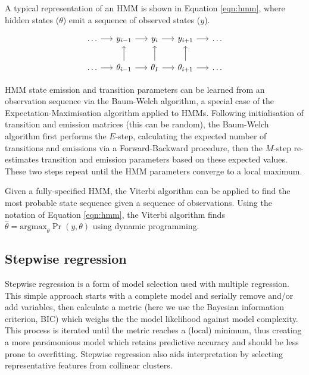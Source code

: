 \documentclass[a4paper,11pt,oneside]{book}
\begin{document}
A typical representation of an HMM is shown in Equation \ref{eqn:hmm}, where hidden states ($\theta$) emit a sequence of observed states ($y$).\cite{Volg2005}

\begin{equation}\label{eqn:hmm}
\begin{tikzcd}[column sep=1.2pc]
\ldots \arrow{r} & y_{i-1} \arrow{r} & y_i \arrow{r} & y_{i+1} \arrow{r} & \ldots\\
\ldots \arrow{r} & \theta_{i-1} \arrow{r} \arrow{u} &
\theta_I \arrow{u} \arrow{r} & \theta_{i+1} \arrow{u} \arrow{r} & \ldots
\end{tikzcd}
\end{equation}

HMM state emission and transition parameters can be learned from an observation sequence via the Baum-Welch algorithm,\cite{Baum1970} a special case of the Expectation-Maximisation algorithm applied to HMMs. Following initialisation of transition and emission matrices (this can be random), the Baum-Welch algorithm first performs the $E$-step, calculating the expected number of transitions and emissions via a Forward-Backward procedure, then the $M$-step re-estimates transition and emission parameters based on these expected values. These two steps repeat until the HMM parameters converge to a local maximum.

Given a fully-specified HMM, the Viterbi algorithm can be applied to find the most probable state sequence given a sequence of observations.\cite{ryan1993viterbi} Using the notation of Equation \ref{eqn:hmm}, the Viterbi algorithm finds $\hat{\theta} = \mathrm{argmax}_\theta \Pr( y, \theta)$ using dynamic programming.\cite{Volg2005}

\subsection{Stepwise regression}\label{meth:stepregress}

Stepwise regression is a form of model selection used with multiple regression. This simple approach starts with a complete model and serially remove and/or add variables, then calculate a metric (here we use the Bayesian information criterion, BIC) which weighs the the model likelihood against model complexity. This process is iterated until the metric reaches a (local) minimum, thus creating a more parsimonious model which retains predictive accuracy and should be less prone to overfitting. Stepwise regression also aids interpretation by selecting representative features from collinear clusters.\cite{Mantel1970} 
\end{document}
